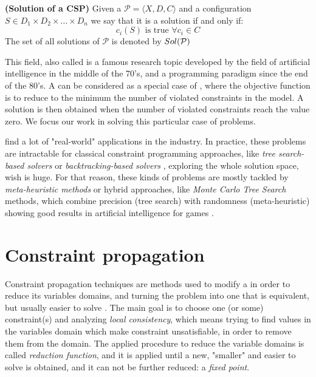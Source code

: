 \begin{definition}{\bf (Solution of a CSP)}
\label{solCSP}
Given a \csp{} $\mathcal{P}=\langle X,D,C \rangle$ and a configuration $S \in D_1\times D_2\times\dots\times D_n$ we say that it is a solution if and only if:	
\begin{equation*}
c_i\left(S\right)\text{ is true }\forall c_i \in C
\end{equation*}
The set of all solutions of $\mathcal{P}$ is denoted by $\mathnormal{Sol}(\mathcal{P})$
\end{definition}

This field, also called \CP{} is a famous research topic developed by the field of artificial intelligence in the middle of the 70's, and a programming paradigm since the end of the 80's. A \csp{} can be considered as a special case of \COPs, where the objective function is to reduce to the minimum the number of violated constraints in the model. A solution is then obtained when the number of violated constraints reach the value zero. We focus our work in solving this particular case of problems.

\csps{} find a lot of "real-world" applications in the industry. In practice, these problems are intractable for classical constraint programming approaches, like \textit{tree search-based solvers} or {\it backtracking-based solvers} \cite{Abio2014}, exploring the whole solution space, wish is huge. For that reason, these kinds of problems are mostly tackled by {\it meta-heuristic methods} or hybrid approaches, like \textit{Monte Carlo Tree Search} methods, which combine precision (tree search) with randomness (meta-heuristic) showing good results in artificial intelligence for games \cite{Chaslot2008, Browne2012}.

\section{Constraint propagation}\label{sec:progagation}

Constraint propagation techniques are methods used to modify a \CSP{} in order to reduce its variables domains, and turning the problem into one that is equivalent, but usually easier to solve \cite{ChristianBessiere2006}. The main goal is to choose one (or some) constraint(s) and analyzing \textit{local consistency}, which means trying to find values in the variables domain which make constraint unsatisfiable, in order to remove them from the domain. The applied procedure to reduce the variable domains is called \textit{reduction function}, and it is applied until a new, "smaller" and easier to solve is obtained, and it can not be further reduced: a \textit{fixed point}.

